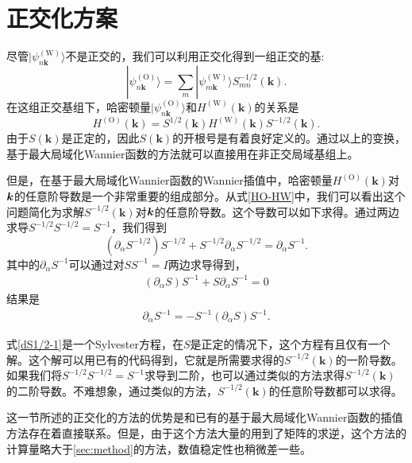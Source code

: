 \section{正交化方案}

尽管$|\psi^{(\text{W})}_{n\boldsymbol{k}}\rangle$不是正交的，我们可以利用正交化得到一组正交的基:
\begin{equation}
|\psi^{(\text{O})}_{n\boldsymbol{k}}\rangle=
\sum_m |\psi^{(\text{W})}_{m\boldsymbol{k}}\rangle S^{-1/2}_{mn}(\boldsymbol{k}).
\end{equation}
在这组正交基组下，哈密顿量$|\psi^{(\text{O})}_{n\boldsymbol{k}}\rangle$和$H^{(\text{W})}(\boldsymbol{k})$的关系是
\begin{equation}
H^{(\text{O})}(\boldsymbol{k})=S^{1/2}(\boldsymbol{k})H^{(\text{W})}(\boldsymbol{k})S^{-1/2}(\boldsymbol{k}).\label{HO-HW}
\end{equation}
由于$S(\boldsymbol{k})$是正定的，因此$S(\boldsymbol{k})$的开根号是有着良好定义的。通过以上的变换，基于最大局域化Wannier函数的方法就可以直接用在非正交局域基组上。

但是，在基于最大局域化Wannier函数的Wannier插值中，哈密顿量$H^{(\text{O})}(\boldsymbol{k})$对$\boldsymbol{k}$的任意阶导数是一个非常重要的组成部分。从式\ref{HO-HW}中，我们可以看出这个问题简化为求解$S^{-1/2}(\boldsymbol{k})$对$\boldsymbol{k}$的任意阶导数。这个导数可以如下求得。通过两边求导$S^{-1/2}S^{-1/2}=S^{-1}$，我们得到
\begin{equation}
(\partial_{\alpha}S^{-1/2})S^{-1/2}+S^{-1/2}\partial_{\alpha}S^{-1/2}=\partial_{\alpha}S^{-1}.\label{dS1/2-1}
\end{equation}
其中的$\partial_{\alpha}S^{-1}$可以通过对$SS^{-1}=I$两边求导得到，
\begin{align}
(\partial_{\alpha}S)S^{-1}+S\partial_{\alpha}S^{-1}=0
\end{align}
结果是
\begin{align}
\partial_{\alpha}S^{-1} = -S^{-1}(\partial_{\alpha}S)S^{-1}.
\end{align}

式\ref{dS1/2-1}是一个Sylvester方程\cite{sylvester}，在$S$是正定的情况下，这个方程有且仅有一个解。这个解可以用已有的代码得到\cite{laug}，它就是所需要求得的$S^{-1/2}(\boldsymbol{k})$的一阶导数。如果我们将$S^{-1/2}S^{-1/2}=S^{-1}$求导到二阶，也可以通过类似的方法求得$S^{-1/2}(\boldsymbol{k})$的二阶导数。不难想象，通过类似的方法，$S^{-1/2}(\boldsymbol{k})$的任意阶导数都可以求得。


这一节所述的正交化的方法的优势是和已有的基于最大局域化Wannier函数的插值方法存在着直接联系。但是，由于这个方法大量的用到了矩阵的求逆，这个方法的计算量略大于\ref{sec:method}的方法，数值稳定性也稍微差一些。


